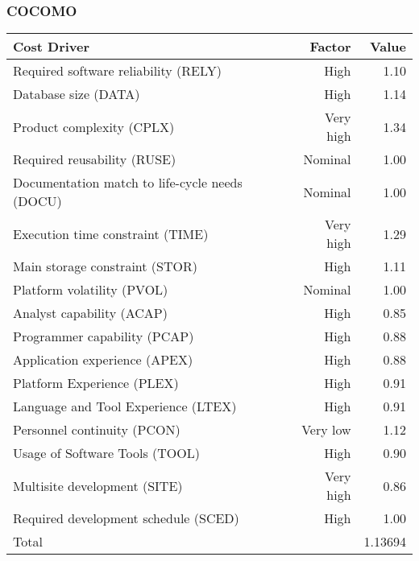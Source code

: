 \begin{frame}
	\frametitle{COCOMO}
	\begin{table}[H]
		\small
		\centering
		\vspace*{-0.2cm}
		\begin{tabular}{|l|r|r|}
			\hline
			Cost Driver & Factor & Value \\
			\hline
			Required software reliability (RELY) & High & 1.10 \\
			Database size (DATA) & High & 1.14 \\ Product complexity (CPLX) & Very high & 1.34 \\
			Required reusability (RUSE) & Nominal & 1.00 \\
			Documentation match to life-cycle needs (DOCU) & Nominal & 1.00 \\
			Execution time constraint (TIME) & Very high & 1.29 \\
			Main storage constraint (STOR) & High & 1.11 \\
			Platform volatility (PVOL) & Nominal & 1.00 \\
			Analyst capability (ACAP) & High & 0.85 \\
			Programmer capability (PCAP) & High & 0.88 \\
			Application experience (APEX) & High & 0.88 \\
			Platform Experience (PLEX) & High & 0.91 \\
			Language and Tool Experience (LTEX) & High & 0.91 \\
			Personnel continuity (PCON) & Very low & 1.12 \\
			Usage of Software Tools (TOOL) & High & 0.90 \\
			Multisite development (SITE) & Very high & 0.86 \\
			Required development schedule (SCED) & High & 1.00 \\
			\hline
			\multicolumn{2}{|l|}{Total} & 1.13694 \\
			\hline	
		\end{tabular}
	\end{table}
\end{frame}

